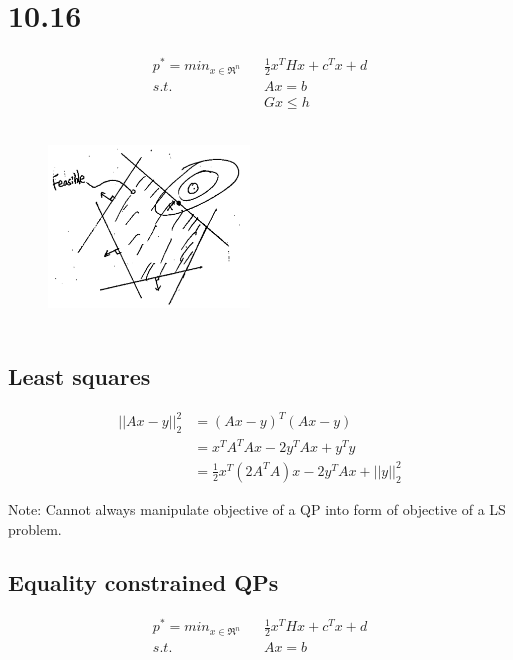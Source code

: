 \section{10.16}


\begin{align*}
p^* = min_{x\in \Re^n}\,\,\,\,\, &\frac{1}{2}x^THx + c^Tx + d\\
 s.t.\,\,\,\,\, &Ax = b\\
 &Gx\leq h
\end{align*}


\begin{figure}
	\centering
	\includegraphics[width=2.1in,height=2.1in]{figures/ch07/figure1016_a.png}
\end{figure}

\subsection{Least squares}
\begin{align*}
||Ax - y||_2^2 &= (Ax - y)^T(Ax - y)\\
&= x^TA^TAx - 2y^TAx + y^Ty\\
&= \frac{1}{2}x^T(2A^TA)x - 2y^TAx + ||y||_2^2
\end{align*}

Note: Cannot always manipulate objective of a QP into form of objective of a LS problem.\\

\subsection{Equality constrained QPs}

\begin{align*}
p^* = min_{x\in \Re^n}\,\,\,\,\, &\frac{1}{2}x^THx + c^Tx + d\\
s.t.\,\,\,\,\, &Ax = b
\end{align*}


